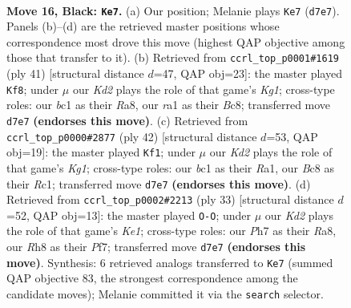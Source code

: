 \documentclass[11pt]{article}
\begin{document}
\clearpage

\begin{figure}[p]\centering
\begin{subfigure}{0.46\textwidth}\centering
\resizebox{\linewidth}{!}{%
\newchessgame
\chessboard[
  setfen={r1b2b1r/p1pk1p1p/2p3p1/8/P1P2P1P/8/1P4R1/RNB1K3 b Q - 0 16},
  showmover=false,
  pgfstyle=straightmove, color=movearrow, markmove={d7-e7}
]}
\caption{}
\end{subfigure}\hfill
\begin{subfigure}{0.46\textwidth}\centering
\resizebox{\linewidth}{!}{%
\newchessgame
\chessboard[
  setfen={r1br2k1/pp2pp1p/6p1/3P4/1RB1P3/4K3/2R2PPP/8 b - - 0 21},
  showmover=false,
  pgfstyle=straightmove, color=movearrow, markmove={g8-f8}
]}
\caption{}
\end{subfigure}
\\[4pt]
\begin{subfigure}{0.46\textwidth}\centering
\resizebox{\linewidth}{!}{%
\newchessgame
\chessboard[
  setfen={2r1r3/pp3p1k/7p/2np2p1/8/2B1P3/PP3PPP/R1R3K1 w - - 3 22},
  showmover=false,
  pgfstyle=straightmove, color=movearrow, markmove={g1-f1}
]}
\caption{}
\end{subfigure}\hfill
\begin{subfigure}{0.46\textwidth}\centering
\resizebox{\linewidth}{!}{%
\newchessgame
\chessboard[
  setfen={r1b1k2r/1p3ppp/p7/8/P2R1p2/8/1PP3PP/2K2B1R b kq - 1 17},
  showmover=false,
  pgfstyle=straightmove, color=movearrow, markmove={e8-g8}
]}
\caption{}
\end{subfigure}
\caption{\textbf{Move 16, Black: \texttt{Ke7}.} (a) Our position; Melanie plays \texttt{Ke7} (\texttt{d7e7}). Panels (b)--(d) are the retrieved master positions whose correspondence most drove this move (highest QAP objective among those that transfer to it). (b) Retrieved from \texttt{ccrl\_top\_p0001\#1619} (ply 41) [structural distance $d$=47, QAP obj=23]: the master played \texttt{Kf8}; under $\mu$ our \emph{Kd2} plays the role of that game's \emph{Kg1}; cross-type roles: our \emph{b}c1 as their \emph{R}a8, our \emph{r}a1 as their \emph{B}c8; transferred move \texttt{d7e7} \textbf{(endorses this move)}. (c) Retrieved from \texttt{ccrl\_top\_p0000\#2877} (ply 42) [structural distance $d$=53, QAP obj=19]: the master played \texttt{Kf1}; under $\mu$ our \emph{Kd2} plays the role of that game's \emph{Kg1}; cross-type roles: our \emph{b}c1 as their \emph{R}a1, our \emph{B}c8 as their \emph{R}c1; transferred move \texttt{d7e7} \textbf{(endorses this move)}. (d) Retrieved from \texttt{ccrl\_top\_p0002\#2213} (ply 33) [structural distance $d$=52, QAP obj=13]: the master played \texttt{O-O}; under $\mu$ our \emph{Kd2} plays the role of that game's \emph{Ke1}; cross-type roles: our \emph{P}h7 as their \emph{R}a8, our \emph{R}h8 as their \emph{P}f7; transferred move \texttt{d7e7} \textbf{(endorses this move)}. Synthesis: 6 retrieved analogs transferred to \texttt{Ke7} (summed QAP objective 83, the strongest correspondence among the candidate moves); Melanie committed it via the \texttt{search} selector.}
\label{fig:thought-m31}
\end{figure}
\end{document}

